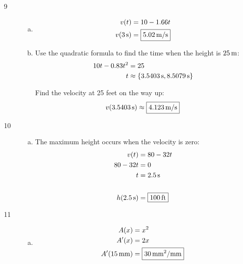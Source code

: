 \documentclass[letterpaper, landscape]{exam}
\begin{document}
\begin{description}
\begin{enumerate}[(a)]
      \end{enumerate}


    \item[9]
      \begin{enumerate}[(a)]
        \item 
          \begin{align*}
            v(t)           & = 10 - 1.66t \\
            v(\unit[3]{s}) & = \boxed{ \unit[5.02]{m/s} } \\
          \end{align*}

        \item
          Use the quadratic formula to find the time when the height is $\unit[25]{m}$:
          \begin{align*}
            10 t - 0.83 t^2 & = 25 \\
            t               & \approx \{ \unit[3.5403]{s}, \unit[8.5079]{s} \} \\
          \end{align*}

          Find the velocity at 25 feet on the way up:
          \[
            v(\unit[3.5403]{s}) \approx \boxed{ \unit[4.123]{m/s} }
          \]

      \end{enumerate}
      
    \item[10]
      \begin{enumerate}[(a)]
        \item 
          The maximum height occurs when the velocity is zero:
          \begin{align*}
            v(t)             & = 80 - 32t \\
            80 - 32t         & = 0 \\
            t                & = \unit[2.5]{s} \\
            \\
            h(\unit[2.5]{s}) & = \boxed{ \unit[100]{ft} } \\
          \end{align*}

      \end{enumerate}

    \item[11]
      \begin{enumerate}[(a)]
        \item 
          \begin{align*}
            A(x)              & = x^2 \\
            A'(x)             & = 2x \\
            A'(\unit[15]{mm}) & = \boxed{ \unit[30]{mm^2/mm} } \\
          \end{align*}


\end{enumerate}
\end{description}
\end{document}
